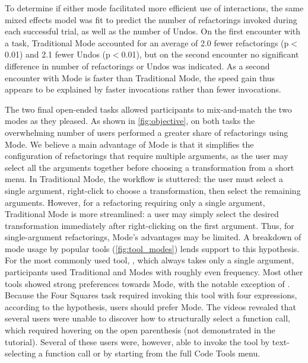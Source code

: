  To
determine if either mode facilitated more efficient use of interactions, the
same mixed effects model was fit to predict the number of refactorings invoked during each
successful trial, as well as the number of Undos.
On the first encounter with a task, Traditional Mode accounted for an average
of 2.0 fewer refactorings (p$<$0.01) and 2.1 fewer Undos (p$<$0.01), but on the second encounter no significant difference in
number of refactorings or Undos was indicated. As a second encounter with \deuce{} Mode is faster than
Traditional Mode, the speed gain thus appears to be explained by faster invocations rather than fewer
invocations.


The two final open-ended tasks allowed participants to mix-and-match the two modes
as they pleased. As shown in \autoref{fig:objective}, on both tasks the overwhelming number of users performed a
greater share of refactorings using \deuce{} Mode. We believe a main advantage of \deuce{}
 Mode is that it simplifies the configuration of refactorings that require multiple arguments, as the user
may select all the arguments together before choosing a transformation from a short menu. In
Traditional Mode, the workflow is stuttered: the user must select a single argument, right-click
to choose a transformation, then select the remaining arguments. However, for a refactoring requiring
only a single argument, Traditional Mode is more streamlined: a user may simply select the desired
transformation immediately after right-clicking on the first argument. Thus, for single-argument
refactorings, \deuce{} Mode's advantages may be limited. A breakdown of mode usage by popular tools
(\autoref{fig:tool_modes}) lends support to this hypothesis. For the most commonly used tool, ,
which always takes only a single argument, participants used Traditional and \deuce{} Modes with
roughly even frequency. Most other tools showed strong preferences towards \deuce{} Mode, with
the notable exception of  .
Because the Four Squares task required invoking this tool with four expressions, according to
the hypothesis, users should prefer \deuce{} Mode. The videos revealed that several
users were unable to discover how to structurally select a function call, which required hovering
on the open parenthesis (not demonstrated
in the tutorial). Several of these users were, however, able to invoke the tool by
text-selecting a function call or by starting from the full Code Tools menu.

